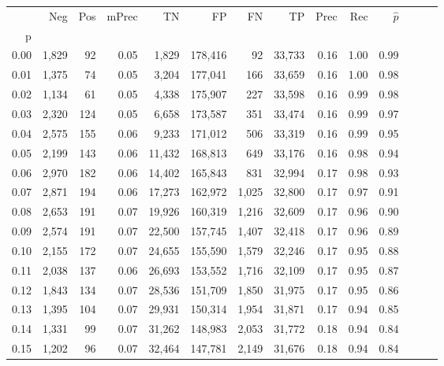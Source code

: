 \begin{tabular}{rrrrrrrrrrrrrr}
\toprule
{} &    Neg &  Pos & mPrec &       TN &       FP &      FN &      TP &  Prec &   Rec & $\hat{p}$ \\
p    &        &      &       &          &          &         &         &       &       &           \\
\midrule
0.00 &  1,829 &   92 &  0.05 &    1,829 &  178,416 &      92 &  33,733 &  0.16 &  1.00 &      0.99 \\
0.01 &  1,375 &   74 &  0.05 &    3,204 &  177,041 &     166 &  33,659 &  0.16 &  1.00 &      0.98 \\
0.02 &  1,134 &   61 &  0.05 &    4,338 &  175,907 &     227 &  33,598 &  0.16 &  0.99 &      0.98 \\
0.03 &  2,320 &  124 &  0.05 &    6,658 &  173,587 &     351 &  33,474 &  0.16 &  0.99 &      0.97 \\
0.04 &  2,575 &  155 &  0.06 &    9,233 &  171,012 &     506 &  33,319 &  0.16 &  0.99 &      0.95 \\
0.05 &  2,199 &  143 &  0.06 &   11,432 &  168,813 &     649 &  33,176 &  0.16 &  0.98 &      0.94 \\
0.06 &  2,970 &  182 &  0.06 &   14,402 &  165,843 &     831 &  32,994 &  0.17 &  0.98 &      0.93 \\
0.07 &  2,871 &  194 &  0.06 &   17,273 &  162,972 &   1,025 &  32,800 &  0.17 &  0.97 &      0.91 \\
0.08 &  2,653 &  191 &  0.07 &   19,926 &  160,319 &   1,216 &  32,609 &  0.17 &  0.96 &      0.90 \\
0.09 &  2,574 &  191 &  0.07 &   22,500 &  157,745 &   1,407 &  32,418 &  0.17 &  0.96 &      0.89 \\
0.10 &  2,155 &  172 &  0.07 &   24,655 &  155,590 &   1,579 &  32,246 &  0.17 &  0.95 &      0.88 \\
0.11 &  2,038 &  137 &  0.06 &   26,693 &  153,552 &   1,716 &  32,109 &  0.17 &  0.95 &      0.87 \\
0.12 &  1,843 &  134 &  0.07 &   28,536 &  151,709 &   1,850 &  31,975 &  0.17 &  0.95 &      0.86 \\
0.13 &  1,395 &  104 &  0.07 &   29,931 &  150,314 &   1,954 &  31,871 &  0.17 &  0.94 &      0.85 \\
0.14 &  1,331 &   99 &  0.07 &   31,262 &  148,983 &   2,053 &  31,772 &  0.18 &  0.94 &      0.84 \\
0.15 &  1,202 &   96 &  0.07 &   32,464 &  147,781 &   2,149 &  31,676 &  0.18 &  0.94 &      0.84 \\

\end{tabular}
